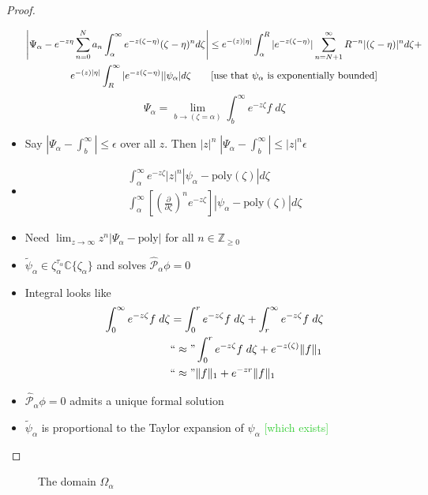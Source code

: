 \documentclass{article}
\let\Re\relax
\DeclareMathOperator{\Re}{Re}
\newcommand{\Z}{\mathbb{Z}}
\newcommand{\C}{\mathbb{C}}
\theoremstyle{definition}
\theoremstyle{plain}
\begin{document}
\begin{proof}
\begin{itemize}
\begin{multline*}
            \left|\Psi_\alpha- e^{-z\eta} \sum_{n=0}^N a_n \int_\alpha^\infty e^{-z(\zeta - \eta)} (\zeta-\eta)^n d\zeta\right|\leq e^{-\Re(z)|\eta|} \int_\alpha^R |e^{-z(\zeta - \eta)} |\sum_{n=N+1}^\infty R^{-n} |(\zeta-\eta)|^n d\zeta +\\
            e^{-\Re(z)|\eta|} \int_R^\infty |e^{-z(\zeta - \eta)} | |\psi_\alpha| d\zeta \qquad\text{[use that $\psi_\alpha$ is exponentially bounded]}
        \end{multline*}
       \[\Psi_\alpha=\lim_{b \to (\zeta = \alpha)}\int_b^\infty e^{-z\zeta} f\;d\zeta \]
       \item Say $\left|\Psi_\alpha - \int_b^{\infty}\right| \leq \epsilon$ over all $z$. Then $|z|^n\;\left|\Psi_\alpha - \int_b^{\infty}\right| \leq |z|^n \epsilon$
       \item \begin{align*}
       \int_\alpha^\infty e^{-z\zeta} |z|^n |\psi_\alpha-\text{poly}(\zeta)| d\zeta \\
       \int_\alpha^\infty \left[\left(\tfrac{\partial}{\partial \zeta}\right)^n e^{-z\zeta}\right] |\psi_\alpha-\text{poly}(\zeta)| d\zeta
       \end{align*}
       \item Need $\lim_{z \to \infty} z^n |\Psi_\alpha - \text{poly}|$ for all $n \in \Z_{\ge 0}$
        \item $\tilde{\psi}_\alpha\in\zeta_\alpha^{\tau_\alpha}\C\lbrace\zeta_\alpha\rbrace$ and solves $\hat{\mathcal{P}}_\alpha\phi=0$
        \item Integral looks like
        \begin{align*}
        \int_0^\infty e^{-z\zeta} f\;d\zeta & = \int_0^r e^{-z\zeta} f\;d\zeta + \int_r^\infty e^{-z\zeta} f\;d\zeta \\
        & \text{``}\approx\text{''} \int_0^r e^{-z\zeta} f\;d\zeta + e^{-z \Re(\zeta)} \|f\|_1 \\
        & \text{``}\approx\text{''} \|f\|_1 + e^{-zr} \|f\|_1
        \end{align*}
        \item $\hat{\mathcal{P}}_\alpha\phi=0$ admits a unique formal solution
        \item  $\tilde{\psi}_\alpha$ is proportional to the Taylor expansion of $\psi_\alpha$ \textcolor{LimeGreen}{[which exists]}
    \end{itemize}
\end{proof}
\color{Maroon}
\begin{figure}[h]
\center
{}
\caption{The domain $\Omega_\alpha$}\label{Fig:domain}
\end{figure}
\end{document}
